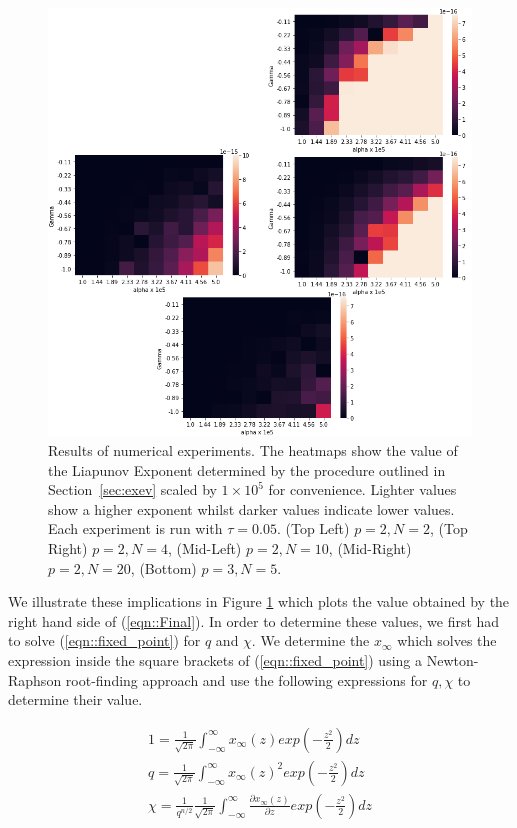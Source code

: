 \documentclass[sigconf]{aamas}
\newcommand{\xfixed}{x_\infty}
\newcommand\fb[1]{\textcolor{blue}{FB: #1}}
\begin{document}
\begin{figure}
    \centering
    \includegraphics[width = 1.1 \linewidth]{Figures/Theory.png}
    \caption{Results of numerical experiments. The heatmaps show the value of the Liapunov Exponent determined by the procedure outlined in Section~\ref{sec:exev} scaled by $1 \times 10^5$ for convenience. Lighter values show a higher exponent whilst darker values indicate lower values. Each experiment is run with $\tau = 0.05$. (Top Left) $p = 2, N = 2$, (Top Right) $p = 2, N = 4$, (Mid-Left) $p = 2, N = 10$, (Mid-Right) $p = 2, N = 20$, (Bottom) $p = 3, N = 5$.}
    \label{fig:theory}
\end{figure}

We illustrate these implications in Figure \ref{fig:theory} which plots the value obtained by the right hand side of (\ref{eqn::Final}). In order to determine these values, we first had to solve (\ref{eqn::fixed_point}) for $q$ and $\chi$. We determine the $\xfixed$ which solves the expression inside the square brackets of (\ref{eqn::fixed_point}) using a Newton-Raphson root-finding approach and use the following expressions for $q, \chi$ to determine their value. 

\begin{equation*}
    \begin{split}
        1 = \frac{1}{\sqrt{2 \pi}} \int_{-\infty}^{\infty} \xfixed(z) exp(-\frac{z^2}{2}) dz \\ 
        q = \frac{1}{\sqrt{2 \pi}} \int_{-\infty}^{\infty} \xfixed(z)^2 exp(-\frac{z^2}{2}) dz \\ 
        \chi = \frac{1}{q^{n/2}}\frac{1}{\sqrt{2 \pi}} \int_{-\infty}^{\infty} \frac{\partial \xfixed (z)}{\partial z} exp(-\frac{z^2}{2}) dz
    \end{split}
\end{equation*}
\end{document}
